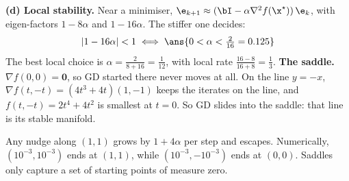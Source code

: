 \begin{frame}{}
  \textbf{(d) Local stability.} Near a minimiser, $\e_{k+1} \approx (\bI - \alpha\nabla^2 f(\x^\star))\,\e_k$,
  with eigen-factors $1 - 8\alpha$ and $1 - 16\alpha$. The stiffer one decides:
  \[
    |1-16\alpha| < 1 \;\Longleftrightarrow\; \ans{0 < \alpha < \tfrac{2}{16} = 0.125}
  \]
  The best local choice is $\alpha = \tfrac{2}{8+16} = \tfrac1{12}$, with local rate $\tfrac{16-8}{16+8} = \tfrac13$.
  \textbf{The saddle.} $\nabla f(0,0) = \mathbf 0$, so GD started there \alert{never moves at all}.
  On the line $y=-x$, $\nabla f(t,-t) = (4t^3+4t)(1,-1)$ keeps the iterates on the line, and $f(t,-t) = 2t^4+4t^2$
  is smallest at $t=0$. So GD \alert{slides into the saddle}: that line is its stable manifold.

  \begin{keybox}[Insight]
    Any nudge along $(1,1)$ grows by $1+4\alpha$ per step and escapes.
    Numerically, $(10^{-3},10^{-3})$ ends at $(1,1)$, while $(10^{-3},-10^{-3})$ ends at $(0,0)$.
    Saddles only capture a set of starting points of measure zero.
  \end{keybox}
\end{frame}
